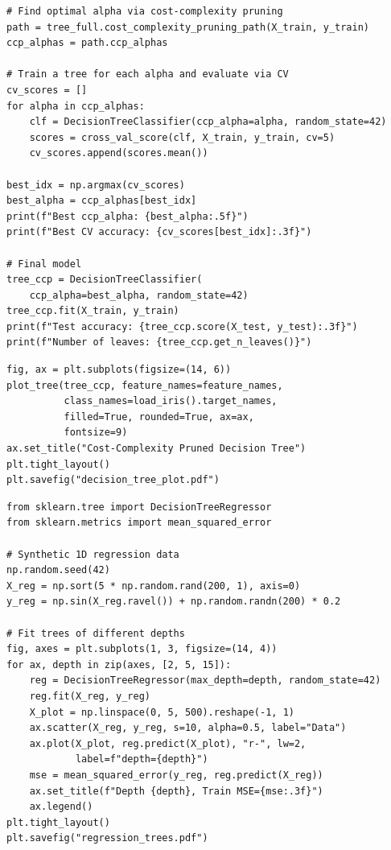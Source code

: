 \begin{codeblock}[title=\textbf{Cost-Complexity Pruning Path}]
\begin{verbatim}
# Find optimal alpha via cost-complexity pruning
path = tree_full.cost_complexity_pruning_path(X_train, y_train)
ccp_alphas = path.ccp_alphas

# Train a tree for each alpha and evaluate via CV
cv_scores = []
for alpha in ccp_alphas:
    clf = DecisionTreeClassifier(ccp_alpha=alpha, random_state=42)
    scores = cross_val_score(clf, X_train, y_train, cv=5)
    cv_scores.append(scores.mean())

best_idx = np.argmax(cv_scores)
best_alpha = ccp_alphas[best_idx]
print(f"Best ccp_alpha: {best_alpha:.5f}")
print(f"Best CV accuracy: {cv_scores[best_idx]:.3f}")

# Final model
tree_ccp = DecisionTreeClassifier(
    ccp_alpha=best_alpha, random_state=42)
tree_ccp.fit(X_train, y_train)
print(f"Test accuracy: {tree_ccp.score(X_test, y_test):.3f}")
print(f"Number of leaves: {tree_ccp.get_n_leaves()}")
\end{verbatim}
\end{codeblock}

\begin{codeblock}[title=\textbf{Visualising the Tree}]
\begin{verbatim}
fig, ax = plt.subplots(figsize=(14, 6))
plot_tree(tree_ccp, feature_names=feature_names,
          class_names=load_iris().target_names,
          filled=True, rounded=True, ax=ax,
          fontsize=9)
ax.set_title("Cost-Complexity Pruned Decision Tree")
plt.tight_layout()
plt.savefig("decision_tree_plot.pdf")
\end{verbatim}
\end{codeblock}

\begin{codeblock}[title=\textbf{Regression Tree}]
\begin{verbatim}
from sklearn.tree import DecisionTreeRegressor
from sklearn.metrics import mean_squared_error

# Synthetic 1D regression data
np.random.seed(42)
X_reg = np.sort(5 * np.random.rand(200, 1), axis=0)
y_reg = np.sin(X_reg.ravel()) + np.random.randn(200) * 0.2

# Fit trees of different depths
fig, axes = plt.subplots(1, 3, figsize=(14, 4))
for ax, depth in zip(axes, [2, 5, 15]):
    reg = DecisionTreeRegressor(max_depth=depth, random_state=42)
    reg.fit(X_reg, y_reg)
    X_plot = np.linspace(0, 5, 500).reshape(-1, 1)
    ax.scatter(X_reg, y_reg, s=10, alpha=0.5, label="Data")
    ax.plot(X_plot, reg.predict(X_plot), "r-", lw=2,
            label=f"depth={depth}")
    mse = mean_squared_error(y_reg, reg.predict(X_reg))
    ax.set_title(f"Depth {depth}, Train MSE={mse:.3f}")
    ax.legend()
plt.tight_layout()
plt.savefig("regression_trees.pdf")
\end{verbatim}
\end{codeblock}

